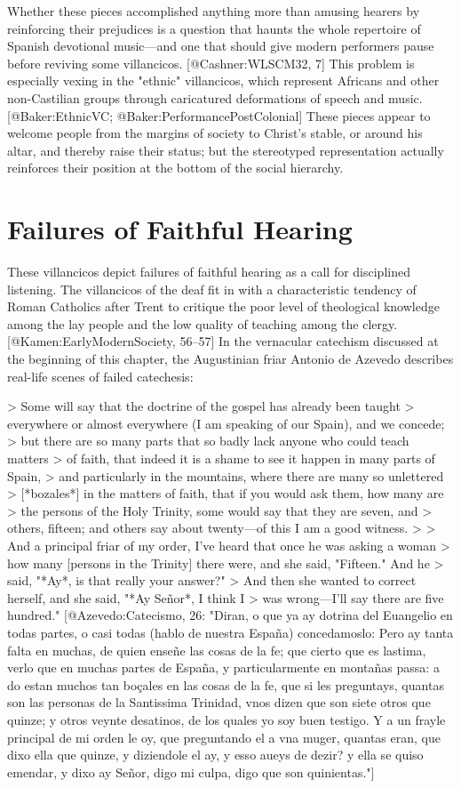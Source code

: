 Whether these pieces accomplished anything more than amusing hearers by
reinforcing their prejudices is a question that haunts the whole repertoire of
Spanish devotional music---and one that should give modern performers pause
before reviving some villancicos.
[@Cashner:WLSCM32, 7]
This problem is especially vexing in the "ethnic" villancicos, which represent
Africans and other non-Castilian groups through caricatured deformations of
speech and music.
[@Baker:EthnicVC; @Baker:PerformancePostColonial]
These pieces appear to welcome people from the margins of society to Christ's
stable, or around his altar, and thereby raise their status; but the stereotyped
representation actually reinforces their position at the bottom of the social
hierarchy.


\section{Failures of Faithful Hearing}

These villancicos depict failures of faithful hearing as a call for disciplined
listening.
The villancicos of the deaf fit in with a characteristic tendency of Roman
Catholics after Trent to critique the poor level of theological knowledge among
the lay people and the low quality of teaching among the clergy.
[@Kamen:EarlyModernSociety, 56--57]
In the vernacular catechism discussed at the beginning of this chapter, the
Augustinian friar Antonio de Azevedo describes real-life scenes of failed
catechesis:

> Some will say that the doctrine of the gospel has already been taught
> everywhere or almost everywhere (I am speaking of our Spain), and we concede;
> but there are so many parts that so badly lack anyone who could teach matters
> of faith, that indeed it is a shame to see it happen in many parts of Spain,
> and particularly in the mountains, where there are many so unlettered
> [*bozales*] in the matters of faith, that if you would ask them, how many are
> the persons of the Holy Trinity, some would say that they are seven, and
> others, fifteen; and others say about twenty---of this I am a good witness. 
>
> And a principal friar of my order, I've heard that once he was asking a woman
> how many [persons in the Trinity] there were, and she said, "Fifteen." And he
> said, "*Ay*, is that really your answer?"
> And then she wanted to correct herself, and she said, "*Ay Señor*, I think I
> was wrong---I'll say there are five hundred." 
[@Azevedo:Catecismo, 26: 
"Diran, o que ya ay dotrina del Euangelio en todas partes, o casi todas (hablo
de nuestra España) concedamoslo: Pero ay tanta falta en muchas, de quien enseñe
las cosas de la fe; que cierto que es lastima, verlo que en muchas partes de
España, y particularmente en montañas passa: a do estan muchos tan boçales en
las cosas de la fe, que si les preguntays, quantas son las personas de la
Santissima Trinidad, vnos dizen que son siete otros que quinze; y otros veynte
desatinos, de los quales yo soy buen testigo.
Y a un frayle principal de mi orden le oy, que preguntando el a vna muger,
quantas eran, que dixo ella que quinze, y diziendole el ay, y esso aueys de
dezir? 
y ella se quiso emendar, y dixo ay Señor, digo mi culpa, digo que son
quinientas."]

